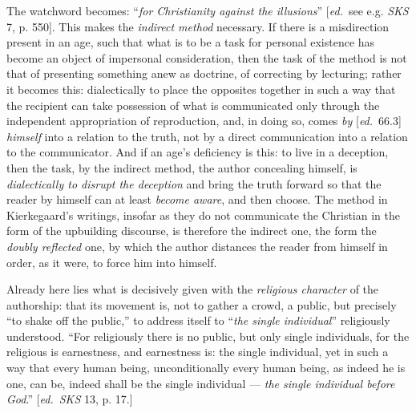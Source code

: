 \documentclass[12pt,a4paper,openany]{book}
\newcommand{\kpage}[1]{\marginnote{\footnotesize\textit{[#1]}}}
\newcommand{\ed}[1]{{\small[\textit{ed.}\ #1]}}
\begin{document}
The watchword becomes: ``\emph{for Christianity against the illusions}'' \ed{see
e.g. \emph{SKS} 7, p. 550}. This makes the \emph{indirect method} necessary. If
there is a misdirection present in an age, such that what is to be a task for
personal existence has become an object of impersonal consideration, then the
task of the method is not that of presenting something anew as doctrine, of
correcting by lecturing; rather it becomes \kpage{104}this: dialectically to
place the opposites together in such a way that the recipient can take
possession of what is communicated only through the independent appropriation
of reproduction, and, in doing so, comes \emph{by} \ed{66.3} \emph{himself}
into a relation to the truth, not by a direct communication into a relation to
the communicator. And if an age's deficiency is this: to live in a deception,
then the task, by the indirect method, the author concealing himself, is
\emph{dialectically to disrupt the deception} and bring the truth forward so
that the reader by himself can at least \emph{become aware}, and then choose.
The method in Kierkegaard's writings, insofar as they do not communicate the
Christian in the form of the upbuilding discourse, is therefore the indirect
one, the form the \emph{doubly reflected} one, by which the author distances
the reader from himself in order, as it were, to force him into himself.

Already here lies what is decisively given with the \emph{religious
character} of the authorship: that its movement is, not to gather a crowd, a
public, but precisely ``to shake off the public,'' to address itself to ``\emph{the
single individual}'' religiously understood. ``For religiously there is no
public, but only single individuals, for the religious is earnestness, and
earnestness is: the single individual, yet in such a way that every human
being, unconditionally every human being, as indeed he is one, can be, indeed
shall be the single individual --- \emph{the single individual before God}.''
\ed{\emph{SKS} 13, p. 17.}
\end{document}
